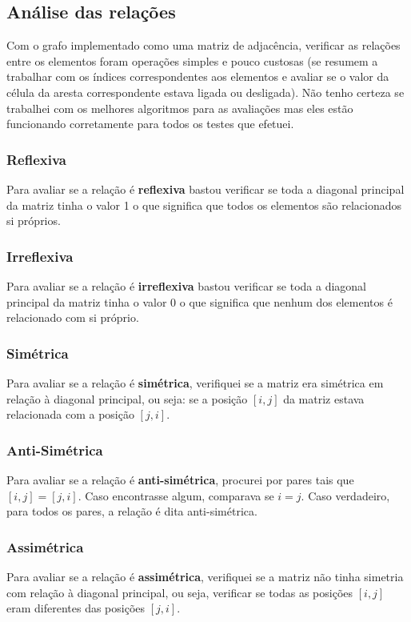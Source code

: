 \documentclass[12pt]{article}
\begin{document}
\subsection{Análise das relações}
Com o grafo implementado como uma matriz de adjacência, verificar as relações entre 
os elementos foram operações simples e pouco custosas (se resumem a trabalhar
com os índices correspondentes aos elementos e avaliar se o valor da célula da aresta 
correspondente estava ligada ou desligada). Não tenho certeza se trabalhei
com os melhores algoritmos para as avaliações mas eles estão funcionando corretamente 
para todos os testes que efetuei.

\subsubsection{Reflexiva}
Para avaliar se a relação é \textbf{reflexiva} bastou verificar se toda a
diagonal principal da matriz tinha o valor 1 o que significa que todos os
elementos são relacionados si próprios.

\subsubsection{Irreflexiva}
Para avaliar se a relação é \textbf{irreflexiva} bastou verificar se toda a
diagonal principal da matriz tinha o valor 0 o que significa que nenhum dos
elementos é relacionado com si próprio.

\subsubsection{Simétrica}
Para avaliar se a relação é \textbf{simétrica}, verifiquei se a matriz era
simétrica em relação à diagonal principal, ou seja: se a posição
$[i,j]$ da matriz estava relacionada com a posição $[j,i]$.

\subsubsection{Anti-Simétrica}
Para avaliar se a relação é \textbf{anti-simétrica}, procurei por pares tais que
$[i,j] = [j,i]$. Caso encontrasse algum, comparava se $i = j$. Caso verdadeiro,
para todos os pares, a relação é dita anti-simétrica.

\subsubsection{Assimétrica}
Para avaliar se a relação é \textbf{assimétrica}, verifiquei se a matriz não
tinha simetria com relação à diagonal principal, ou seja, verificar se todas as
posições $[i,j]$ eram diferentes das posições $[j,i]$.
\end{document}
